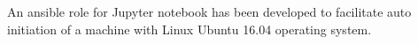An ansible role for Jupyter notebook has been developed to facilitate auto initiation of a machine with Linux Ubuntu 16.04 operating system. 